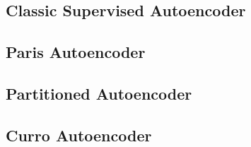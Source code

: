 \subsection{Classic Supervised Autoencoder}


\subsection{Paris Autoencoder}


\subsection{Partitioned Autoencoder}


\subsection{Curro Autoencoder}
